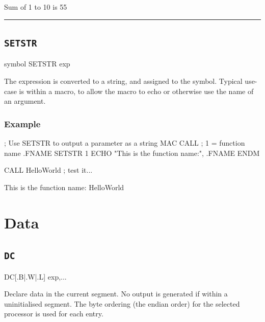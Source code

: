 \begin{outputx}
Sum of 1 to 10 is 55
\end{outputx}


\hrule
\subsection{\texttt{SETSTR}}
\label{pseudoop:setstr}

\begin{usage}
symbol SETSTR exp
\end{usage}

The expression is converted to a string, and assigned to the
symbol. Typical use-case is within a macro, to allow the
macro to echo or otherwise use the name of an argument.

\subsubsection{Example}

\begin{code}[caption=Use of SETSTR to Display Function Name]
; Use SETSTR to output a parameter as a string
    MAC CALL    ; {1} = function name
.FNAME  SETSTR {1}
        ECHO "This is the function name:", .FNAME
    ENDM
    
    CALL HelloWorld        ; test it...
\end{code}

\begin{outputx}
This is the function name: HelloWorld
\end{outputx}



\section{Data}
\subsection{\texttt{DC}}
\label{pseudoop:dc}

\begin{usage}
   DC[{.B|.W|.L}] exp,...
\end{usage}

Declare data in the current segment.  No output is generated if within a uninitialised  segment. The byte ordering (the endian order) for the selected processor is used for each entry.

